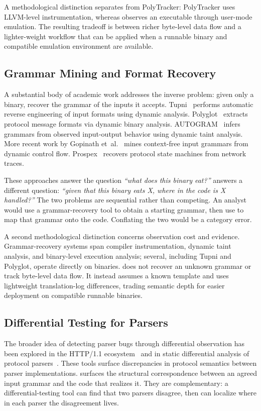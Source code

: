 A methodological distinction separates \toolname from PolyTracker: PolyTracker uses LLVM-level instrumentation, whereas \toolname observes an executable through \QEMU user-mode emulation.
The resulting tradeoff is between richer byte-level data flow and a lighter-weight workflow that can be applied when a runnable binary and compatible emulation environment are available.

\subsection{Grammar Mining and Format Recovery}\label{sec:rel:grammar}

A substantial body of academic work addresses the inverse problem: given only a binary, recover the grammar of the inputs it accepts.
Tupni~\cite{cui2008tupni} performs automatic reverse engineering of input formats using dynamic analysis.
Polyglot~\cite{caballero2007polyglot} extracts protocol message formats via dynamic binary analysis.
AUTOGRAM~\cite{hoschele2016autogram} infers grammars from observed input-output behavior using dynamic taint analysis.
More recent work by Gopinath et~al.~\cite{gopinath2020mining} mines context-free input grammars from dynamic control flow.
Prospex~\cite{comparetti2009prospex} recovers protocol state machines from network traces.

These approaches answer the question \textit{``what does this binary eat?''}
\toolname answers a different question: \textit{``given that this binary eats X, where in the code is X handled?''}
The two problems are sequential rather than competing.
An analyst would use a grammar-recovery tool to obtain a starting grammar, then use \toolname to map that grammar onto the code.
Conflating the two would be a category error.

A second methodological distinction concerns observation cost and evidence.
Grammar-recovery systems span compiler instrumentation, dynamic taint analysis, and binary-level execution analysis; several, including Tupni and Polyglot, operate directly on binaries.
\toolname does not recover an unknown grammar or track byte-level data flow.
It instead assumes a known template and uses lightweight \QEMU translation-log differences, trading semantic depth for easier deployment on compatible runnable binaries.

\subsection{Differential Testing for Parsers}\label{sec:rel:difftesting}

The broader idea of detecting parser bugs through differential observation has been explored in the HTTP/1.1 ecosystem~\cite{http-smuggling} and in static differential analysis of protocol parsers~\cite{zheng2024pardiff}.
These tools surface discrepancies in protocol semantics between parser implementations.
\toolname surfaces the structural correspondence between an agreed input grammar and the code that realizes it.
They are complementary: a differential-testing tool can find that two parsers disagree, then \toolname can localize where in each parser the disagreement lives.

